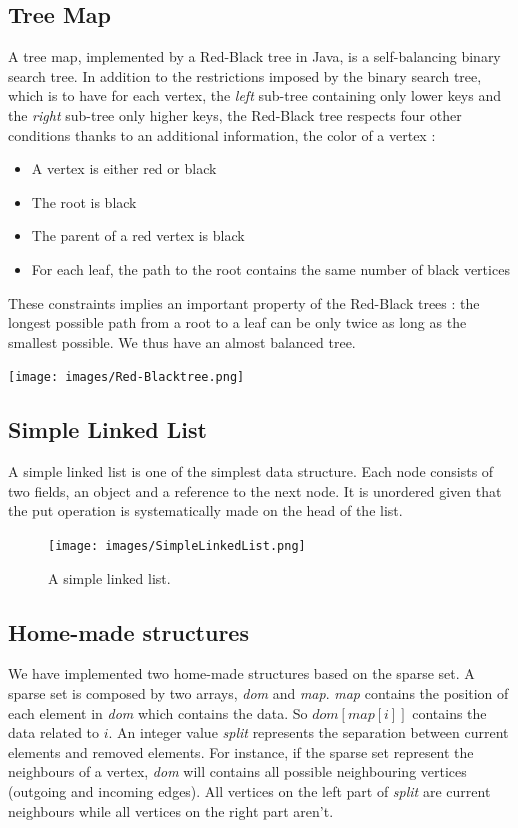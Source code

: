 \subsection{Tree Map}
A tree map, implemented by a Red-Black tree in Java, is a self-balancing binary search tree. In addition to the restrictions imposed by the binary search tree, which is to have for each vertex, the \textit{left} sub-tree containing only lower keys and the \textit{right} sub-tree only higher keys, the Red-Black tree respects four other conditions thanks to an additional information, the color of a vertex :

\begin{itemize}
\item A vertex is either red or black
\item The root is black
\item The parent of a red vertex is black
\item For each leaf, the path to the root contains the same number of black vertices
\end{itemize}

These constraints implies an important property of the Red-Black trees : the longest possible path from a root to a leaf can be only twice as long as the smallest possible. We thus have an almost balanced tree.

\begin{center}
\texttt{[image: images/Red-Blacktree.png]}
\end{center}

\subsection{Simple Linked List}
A simple linked list is one of the simplest data structure. Each node consists of two fields, an object and a reference to the next node. It is unordered given that the put operation is systematically made on the head of the list.

\begin{figure}[!h]
\texttt{[image: images/SimpleLinkedList.png]}
\caption{A simple linked list.}
\end{figure}
\newpage
\subsection{Home-made structures}
We have implemented two home-made structures based on the sparse set. 
A sparse set is composed by two arrays, \textit{dom} and \textit{map}. \textit{map} contains the position of each element in \textit{dom} which contains the data. So $dom[map[i]]$ contains the data related to $i$. An integer value \textit{split} represents the separation between current elements and removed elements. For instance, if the sparse set represent the neighbours of a vertex, \textit{dom} will contains all possible neighbouring vertices (outgoing and incoming edges). All vertices on the left part of \textit{split} are current neighbours while all vertices on the right part aren't. \newline


